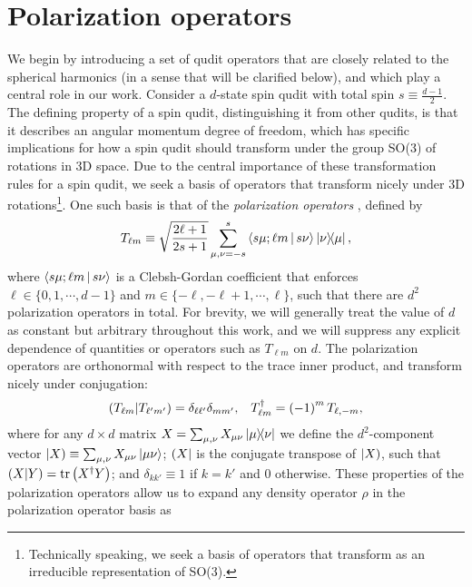 \documentclass[nofootinbib,twocolumn]{revtex4-1}
\newcommand{\f}[2]{\dfrac{#1}{#2}} %
\newcommand{\p}[1]{\left(#1\right)} %
\newcommand{\bk}{\Braket} %
\renewcommand{\set}[1]{\{#1\}} %
\def\obra#1{\mathinner{({#1}|}}
\def\oket#1{\mathinner{|{#1})}}
\def\obk#1{\mathinner{({#1})}}
\begin{document}
\section{Polarization operators}
\label{sec:polarization_ops}

We begin by introducing a set of qudit operators that are closely related to the spherical harmonics (in a sense that will be clarified below), and which play a central role in our work.
Consider a $d$-state spin qudit with total spin $s\equiv\frac{d-1}{2}$.
The defining property of a spin qudit, distinguishing it from other qudits, is that it describes an angular momentum degree of freedom, which has specific implications for how a spin qudit should transform under the group SO(3) of rotations in 3D space.
Due to the central importance of these transformation rules for a spin qudit, we seek a basis of operators that transform nicely under 3D rotations\footnote{Technically speaking, we seek a basis of operators that transform as an irreducible representation of SO(3).}.
One such basis is that of the {\it polarization operators} \cite{kryszewski2006positivity, bertlmann2008bloch}, defined by
\begin{align}
  T_{\ell m} \equiv \sqrt{\f{2\ell+1}{2s+1}} \sum_{\mu,\nu=-s}^s
  \bk{s\mu;\ell m|s\nu} \op{\nu}{\mu},
  \label{eq:trans_op}
\end{align}
where $\bk{s\mu;\ell m|s\nu}$ is a Clebsh-Gordan coefficient that enforces $\ell\in\set{0,1,\cdots,d-1}$ and $m\in\set{-\ell,-\ell+1,\cdots,\ell}$, such that there are $d^2$ polarization operators in total.
For brevity, we will generally treat the value of $d$ as constant but arbitrary throughout this work, and we will suppress any explicit dependence of quantities or operators such as $T_{\ell m}$ on $d$.
The polarization operators are orthonormal with respect to the trace inner product, and transform nicely under conjugation:
\begin{align}
  \obk{T_{\ell m }|T_{\ell'm'}}
  = \delta_{\ell\ell'} \delta_{mm'},
  &&
  T_{\ell m}^\dag = \p{-1}^m T_{\ell,-m},
\end{align}
where for any $d\times d$ matrix $X=\sum_{\mu,\nu} X_{\mu\nu} \op{\mu}{\nu}$ we define the $d^2$-component vector $\oket{X} \equiv \sum_{\mu,\nu} X_{\mu\nu} \ket{\mu\nu}$; $\obra{X}$ is the conjugate transpose of $\oket{X}$, such that $\obk{X|Y}=\tr\p{X^\dag Y}$; and $\delta_{kk'}\equiv 1$ if $k=k'$ and $0$ otherwise.
These properties of the polarization operators allow us to expand any density operator $\rho$ in the polarization operator basis as
\end{document}

